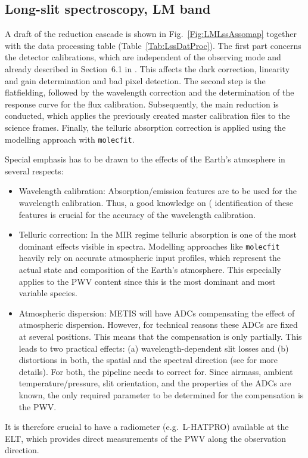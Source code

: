 \subsection{Long-slit spectroscopy, LM band}
\label{ssec:recipes_lss_lm}

A draft of the reduction cascade is shown in
Fig.~\ref{Fig:LMLssAssomap} together with the data processing table
(Table~\ref{Tab:LssDatProc}). The first part concerns the detector
calibrations, which are independent of the observing mode and already
described in Section~6.1 in \cite{DRLS}. This affects the
dark correction, linearity and gain determination and bad pixel
detection. The second step is the flatfielding, followed by the wavelength
correction and the determination of the response curve for the flux calibration. Subsequently, the main reduction is conducted, which applies
the previously created master calibration files to the science frames. Finally, the telluric absorption correction is applied using the modelling approach with \texttt{molecfit}. 

Special emphasis has to be drawn to the effects of the Earth's
atmosphere in several respects:
\begin{itemize}
\item Wavelength calibration: Absorption/emission features are to be
  used for the wavelength calibration. Thus, a good knowledge on (
  identification of these features is crucial for the accuracy of the
  wavelength calibration.
\item Telluric correction: In the MIR regime telluric absorption is
  one of the most dominant effects visible in spectra. Modelling
  approaches like \texttt{molecfit} heavily rely on accurate
  atmospheric input profiles, which represent the actual state and
  composition of the Earth's atmosphere. This especially applies to
  the \ac{PWV} content since this is the most
  dominant and most variable species.
\item Atmospheric dispersion: \ac{METIS} will have \ac{ADC}s compensating the
  effect of atmospheric dispersion. However, for technical reasons
  these ADCs are fixed at several positions. This means that the
  compensation is only partially. This leads to two practical effects:
  (a) wavelength-dependent slit losses and (b) distortions in both,
  the spatial and the spectral direction (see \cite{METIS-ADC_study}
  for more details). For both, the pipeline needs to correct
  for. Since airmass, ambient temperature/pressure, slit orientation,
  and the properties of the \ac{ADC}s are known, the only required
  parameter to be determined for the compensation is the \ac{PWV}.
\end{itemize}
It is therefore crucial to have a radiometer (e.g.\ L-HATPRO)
available at the \ac{ELT}, which provides direct measurements of the \ac{PWV}
along the observation direction.


